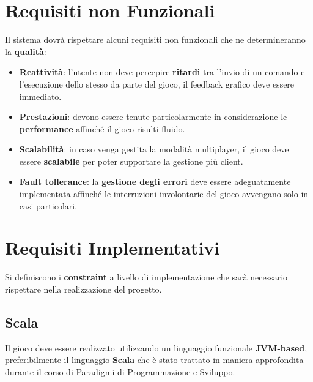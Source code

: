             
	\section{Requisiti non Funzionali}
        Il sistema dovrà rispettare alcuni requisiti non funzionali che ne determineranno la \textbf{qualità}:
        \begin{itemize}
            \item \textbf{Reattività}: l'utente non deve percepire \textbf{ritardi} tra l'invio di un comando e l'esecuzione dello stesso da parte del gioco, il feedback grafico deve essere immediato.
            
            \item \textbf{Prestazioni}: devono essere tenute particolarmente in considerazione le \textbf{performance} affinché il gioco risulti fluido.
            
            \item \textbf{Scalabilità}: in caso venga gestita la modalità multiplayer, il gioco deve essere \textbf{scalabile} per poter supportare la gestione più client.
            
            \item \textbf{Fault tollerance}: la \textbf{gestione degli errori} deve essere adeguatamente implementata affinché le interruzioni involontarie del gioco avvengano solo in casi particolari.
        \end{itemize}
	\section{Requisiti Implementativi}
	Si definiscono i \textbf{constraint} a livello di implementazione che sarà necessario rispettare nella realizzazione del progetto.
        \subsection{Scala}
            Il gioco deve essere realizzato utilizzando un linguaggio funzionale \textbf{JVM-based}, preferibilmente il linguaggio \textbf{Scala} che è stato trattato in maniera approfondita durante il corso di Paradigmi di Programmazione e Sviluppo. 